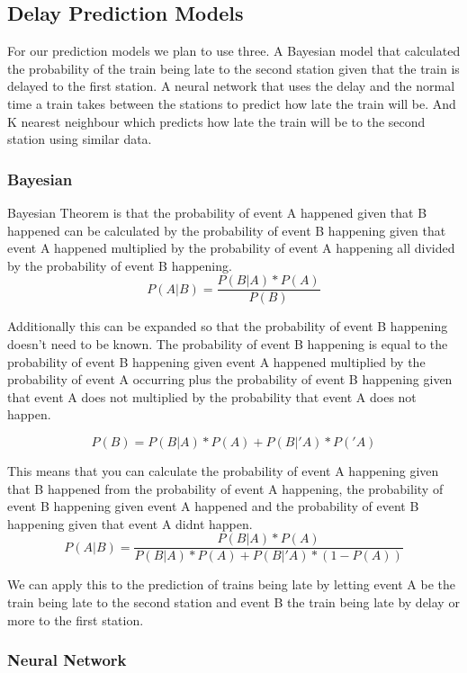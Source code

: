 \documentclass[11pt]{article}
\begin{document}
	\subsection{Delay Prediction Models}
	
	For our prediction models we plan to use three. A Bayesian model that calculated the probability of the train being late to the second station given that the train is delayed to the first station. A neural network that uses the delay and the normal time a train takes between the stations to predict how late the train will be. And K nearest neighbour which predicts how late the train will be to the second station using similar data.
	
	\subsubsection{Bayesian}
	
	Bayesian Theorem is that the probability of event A happened given that B happened can be calculated by the probability of event B happening given that event A happened multiplied by the probability of event A happening all divided by the probability of event B happening.	
	\[P(A|B) = \frac{P(B|A) * P(A)}{P(B)}\]
	
	Additionally this can be expanded so that the probability of event B happening doesn't need to be known. 
	The probability of event B happening is equal to the probability of event B happening given event A happened multiplied by the probability of event A occurring plus the probability of event B happening given that event A does not multiplied by the probability that event A does not happen.
	
	\[P(B) = P(B|A) * P(A) + P(B|'A) * P('A)\]
	
	This means that you can calculate the probability of event A happening given that B happened from the probability of event A happening, the probability of  event B happening given event A happened and the probability of event B happening given that event A didnt happen.
	\[P(A|B) = \frac{P(B|A) * P(A)}{P(B|A) * P(A) + P(B|'A) * (1 - P(A))} \]	
	
	We can apply this to the prediction of trains being late by letting event A be the train being late to the second station and event B the train being late by delay or more to the first station.
	
	\subsubsection{Neural Network}
	
\end{document}
